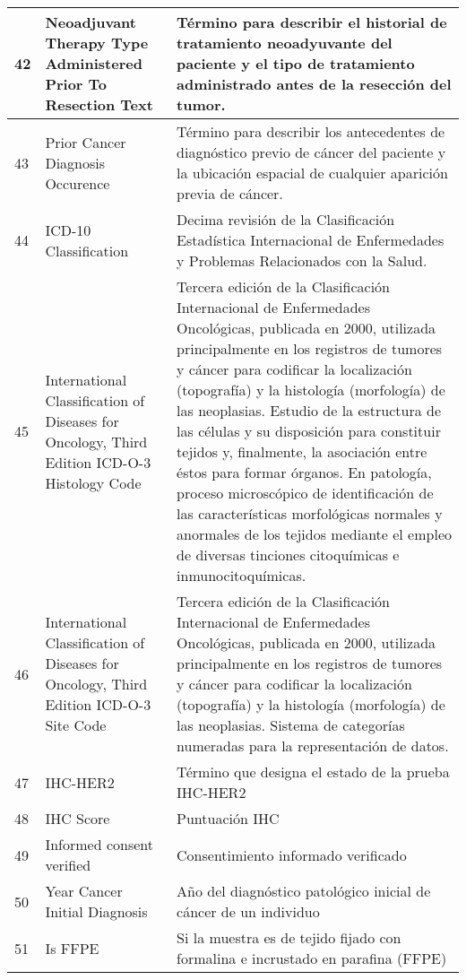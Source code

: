 \begin{table*} [!htb]
\begin{threeparttable}
\begin{tabular}{p{1cm} p{4cm} p{10cm}}
			\\ \hline	42	&	Neoadjuvant Therapy Type Administered Prior To Resection Text	&	Término para describir el historial de tratamiento neoadyuvante del paciente y el tipo de tratamiento administrado antes de la resección del tumor.
			\\ \hline	43	&	Prior Cancer Diagnosis Occurence	&	Término para describir los antecedentes de diagnóstico previo de cáncer del paciente y la ubicación espacial de cualquier aparición previa de cáncer.
			\\ \hline	44	&	ICD-10 Classification	&	Decima revisión de la Clasificación Estadística Internacional de Enfermedades y Problemas Relacionados con la Salud.
			\\ \hline	45	&	International Classification of Diseases for Oncology, Third Edition ICD-O-3 Histology Code	&	Tercera edición de la Clasificación Internacional de Enfermedades Oncológicas, publicada en 2000, utilizada principalmente en los registros de tumores y cáncer para codificar la localización (topografía) y la histología (morfología) de las neoplasias. Estudio de la estructura de las células y su disposición para constituir tejidos y, finalmente, la asociación entre éstos para formar órganos. En patología, proceso microscópico de identificación de las características morfológicas normales y anormales de los tejidos mediante el empleo de diversas tinciones citoquímicas e inmunocitoquímicas.
			\\ \hline	46	&	International Classification of Diseases for Oncology, Third Edition ICD-O-3 Site Code	&	Tercera edición de la Clasificación Internacional de Enfermedades Oncológicas, publicada en 2000, utilizada principalmente en los registros de tumores y cáncer para codificar la localización (topografía) y la histología (morfología) de las neoplasias. Sistema de categorías numeradas para la representación de datos.
			\\ \hline	47	&	IHC-HER2	&	Término que designa el estado de la prueba IHC-HER2
			\\ \hline	48	&	IHC Score	&	Puntuación IHC
			\\ \hline	49	&	Informed consent verified	&	Consentimiento informado verificado
			\\ \hline	50	&	Year Cancer Initial Diagnosis	&	Año del diagnóstico patológico inicial de cáncer de un individuo
			\\ \hline	51	&	Is FFPE	&	Si la muestra es de tejido fijado con formalina e incrustado en parafina (FFPE)
			\\ \hline
		\end{tabular}
	\end{threeparttable}
\end{table*}

